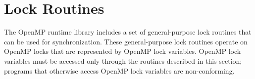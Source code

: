 %
%
%
%
%
%
%
%
%
%
%
%
%


\section{Lock Routines}
\label{sec:Lock Routines}

\vspace{-8pt}

The OpenMP runtime library includes a set of general-purpose lock routines that can be 
used for synchronization. These general-purpose lock routines operate on OpenMP locks 
that are represented by OpenMP lock variables. OpenMP lock variables must be 
accessed only through the routines described in this section; programs that otherwise 
access OpenMP lock variables are non-conforming.

